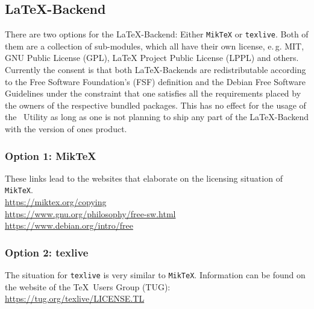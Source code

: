 		\subsection{\LaTeX-Backend}
			There are two options for the \LaTeX-Backend: Either \lstinline$MikTeX$ or \lstinline$texlive$. Both of them are a collection
			of sub-modules, which all have their own license, \mbox{e.\,g.} MIT, GNU Public License (GPL), LaTeX Project Public License (LPPL) and others.
			Currently the consent is that both \LaTeX-Backends are redistributable according to the Free Software Foundation's (FSF) definition and the 
			Debian Free Software Guidelines under the constraint that one satisfies all the requirements placed by the owners of the respective bundled packages.  
			\newline This has no effect for the usage of the \productName~Utility as long as one is not planning to ship any part of the \LaTeX-Backend with the 
			version of ones product.
			
			\subsubsection{Option 1: MikTeX}
				These links lead to the websites that elaborate on the licensing situation of \lstinline$MikTeX$.\\[0.25cm]
				\textcolor{docartTurquoise!75}{\href{https://miktex.org/copying}{https://miktex.org/copying}}\\
				\textcolor{docartTurquoise!75}{\href{https://www.gnu.org/philosophy/free-sw.html}{https://www.gnu.org/philosophy/free-sw.html}}\\
				\textcolor{docartTurquoise!75}{\href{https://www.debian.org/intro/free}{https://www.debian.org/intro/free}}
				
			\subsubsection{Option 2: texlive}
				The situation for \lstinline{texlive} is very similar to \lstinline$MikTeX$. Information can be found on the website of the \TeX~Users Group 
				(TUG):\\[0.25cm]
				\textcolor{docartTurquoise!75}{\href{https://tug.org/texlive/LICENSE.TL}{https://tug.org/texlive/LICENSE.TL}}
		
		\newpage	
